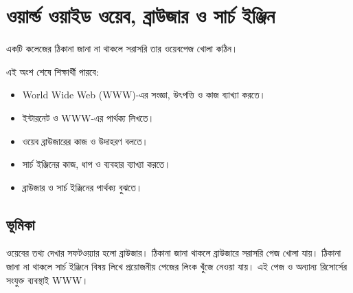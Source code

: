 \section{ওয়ার্ল্ড ওয়াইড ওয়েব, ব্রাউজার ও সার্চ ইঞ্জিন}

একটি কলেজের ঠিকানা জানা না থাকলে সরাসরি তার ওয়েবপেজ খোলা কঠিন।



\begin{learningbox}
এই অংশ শেষে শিক্ষার্থী পারবে:
\begin{itemize}
\item World Wide Web (WWW)-এর সংজ্ঞা, উৎপত্তি ও কাজ ব্যাখ্যা করতে।
\item ইন্টারনেট ও WWW-এর পার্থক্য লিখতে।
\item ওয়েব ব্রাউজারের কাজ ও উদাহরণ বলতে।
\item সার্চ ইঞ্জিনের কাজ, ধাপ ও ব্যবহার ব্যাখ্যা করতে।
\item ব্রাউজার ও সার্চ ইঞ্জিনের পার্থক্য বুঝতে।
\end{itemize}
\end{learningbox}

\subsection{ভূমিকা}

ওয়েবের তথ্য দেখার সফটওয়্যার হলো ব্রাউজার। ঠিকানা জানা থাকলে ব্রাউজারে সরাসরি পেজ খোলা যায়। ঠিকানা জানা না থাকলে সার্চ ইঞ্জিনে বিষয় লিখে প্রয়োজনীয় পেজের লিংক খুঁজে নেওয়া যায়। এই পেজ ও অন্যান্য রিসোর্সের সংযুক্ত ব্যবস্থাই WWW।

